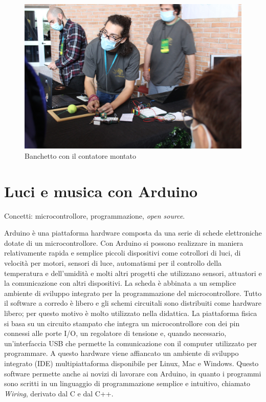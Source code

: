 \documentclass[a4paper]{article}
\begin{document}
\begin{figure}[ht]
  \centering
  \includegraphics[width=\linewidth]{figures/banchetto_contatore}
  \caption{\label{fig:contatore-banchetto} Banchetto con il contatore montato}
\end{figure}


\section{Luci e musica con Arduino}%
\label{sec:arduino}

Concetti: microcontrollore, programmazione, \emph{open source}.

Arduino è una piattaforma hardware composta da una serie di schede elettroniche
dotate di un microcontrollore. Con Arduino si possono realizzare in maniera
relativamente rapida e semplice piccoli dispositivi come cotrollori di luci, di
velocità per motori, sensori di luce, automatismi per il controllo della
temperatura e dell'umidità e molti altri progetti che utilizzano sensori,
attuatori e la comunicazione con altri dispositivi. La scheda è abbinata a un
semplice ambiente di sviluppo integrato per la programmazione del
microcontrollore. Tutto il software a corredo è libero e gli schemi circuitali
sono distribuiti come hardware libero; per questo motivo è molto utilizzato
nella didattica. La piattaforma fisica si basa su un circuito stampato che
integra un microcontrollore con dei pin connessi alle porte I/O, un regolatore
di tensione e, quando necessario, un'interfaccia USB che permette la
comunicazione con il computer utilizzato per programmare. A questo hardware
viene affiancato un ambiente di sviluppo integrato (IDE) multipiattaforma
disponibile per Linux, Mac e Windows. Questo software permette anche ai novizi
di lavorare con Arduino, in quanto i programmi sono scritti in un linguaggio di
programmazione semplice e intuitivo, chiamato \emph{Wiring}, derivato dal C e
dal C++.
\end{document}

